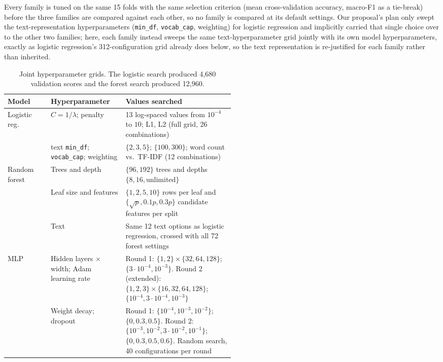 \documentclass[12pt]{article}
\begin{document}
Every family is tuned on the same 15 folds with the same selection criterion (mean cross-validation
accuracy, macro-F1 as a tie-break) before the three families are compared against each other, so no
family is compared at its default settings. Our proposal's plan only swept the text-representation
hyperparameters (\texttt{min\_df}, \texttt{vocab\_cap}, weighting) for logistic regression and
implicitly carried that single choice over to the other two families; here, each family instead
sweeps the same text-hyperparameter grid jointly with its own model hyperparameters, exactly as
logistic regression's 312-configuration grid already does below, so the text representation is
re-justified for each family rather than inherited.

\begin{table}[h]
\centering
\begin{tabularx}{\linewidth}{@{}L{0.19\linewidth}L{0.33\linewidth}Y@{}}
\toprule
Model & Hyperparameter & Values searched \\
\midrule
Logistic reg. & $C=1/\lambda$; penalty & 13 log-spaced values from $10^{-4}$ to $10$; L1, L2
(full grid, 26 combinations) \\
 & text \texttt{min\_df}; \texttt{vocab\_cap}; weighting & $\{2,3,5\}$; $\{100,300\}$; word count
vs.\ TF-IDF (12 combinations) \\
Random forest & Trees and depth & $\{96,192\}$ trees and depths $\{8,16,\text{unlimited}\}$ \\
 & Leaf size and features & $\{1,2,5,10\}$ rows per leaf and $\{\sqrt p,0.1p,0.3p\}$
candidate features per split \\
 & Text & Same 12 text options as logistic regression, crossed with all 72 forest settings \\
MLP & Hidden layers $\times$ width; Adam learning rate & Round 1: $\{1,2\}\times\{32,64,128\}$;
$\{3\!\cdot\!10^{-4},10^{-3}\}$. Round 2 (extended): $\{1,2,3\}\times\{16,32,64,128\}$;
$\{10^{-4},3\!\cdot\!10^{-4},10^{-3}\}$ \\
 & Weight decay; dropout & Round 1: $\{10^{-4},10^{-3},10^{-2}\}$; $\{0,0.3,0.5\}$.
Round 2: $\{10^{-3},10^{-2},3\!\cdot\!10^{-2},10^{-1}\}$; $\{0,0.3,0.5,0.6\}$.
Random search, 40 configurations per round \\
\bottomrule
\end{tabularx}
\caption{Joint hyperparameter grids. The logistic search produced 4,680 validation scores
and the forest search produced 12,960.}
\label{tab:grids}
\end{table}
\end{document}
